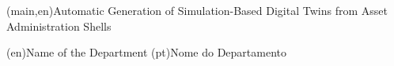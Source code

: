 
%




%
%
%
%
\nttitle(main,en){Automatic Generation of Simulation-Based Digital Twins from Asset Administration Shells}%




%
%
%
%
\ntdepartment*(en){Name of the Department} %
\ntdepartment*(pt){Nome do Departamento}   %



